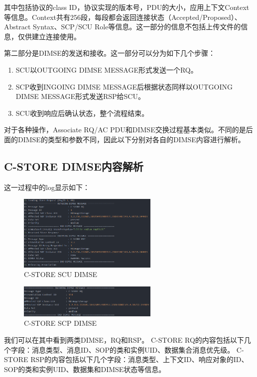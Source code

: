 \documentclass[UTF8]{ctexart}
\begin{document}
其中包括协议的class ID，协议实现的版本号，PDU的大小，应用上下文Context等信息。Context共有256段，每段都会返回连接状态（Accepted/Proposed）、Abstract Syntax、SCP/SCU Role等信息。这一部分的信息不包括上传文件的信息，仅供建立连接使用。

第二部分是DIMSE的发送和接收。这一部分可以分为如下几个步骤：
\begin{enumerate}
    \item SCU以OUTGOING DIMSE MESSAGE形式发送一个RQ。
    \item SCP收到INGOING DIMSE MESSAGE后根据状态同样以OUTGOING DIMSE MESSAGE形式发送RSP给SCU。
    \item SCU收到响应后确认状态，整个流程结束。
\end{enumerate}

对于各种操作，Associate RQ/AC PDU和DIMSE交换过程基本类似。不同的是后面的DIMSE的类型和参数不同，因此以下分别对各自的DIMSE内容进行解析。
\subsection{C-STORE DIMSE内容解析}

这一过程中的log显示如下：
\begin{figure}[H]
    \centering
    \includegraphics[width=0.6\textwidth]{store_DIMSE_scu.png}
    \caption{C-STORE SCU DIMSE}
\end{figure}

\begin{figure}[H]
    \centering
    \includegraphics[width=0.6\textwidth]{store_DIMSE_scp.png}
    \caption{C-STORE SCP DIMSE}
\end{figure}
我们可以在其中看到两类DIMSE，RQ和RSP。
C-STORE RQ的内容包括以下几个字段：消息类型、消息ID、SOP的类和实例UID、数据集合消息优先级。
C-STORE RSP的内容包括以下几个字段：消息类型、上下文ID、响应对象的ID、SOP的类和实例UID、数据集和DIMSE状态等信息。
\end{document}
